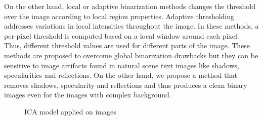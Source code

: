 On the other hand, local or adaptive binarization \cite{A8} methods changes the threshold over the image according to local region properties.
Adaptive thresholding addresses variations in local intensities throughout the image.
In these methods, a per-pixel threshold is computed based on a local window around each pixel.
Thus, different threshold values are used for different parts of the image.
These methods are proposed to overcome global binarization drawbacks but they can be sensitive
to image artifacts found in natural scene text images like shadows, specularities and reflections.
On the other hand, we propose a method that removes shadows, specularity and reflections and thus produces a clean
binary images even for the images with complex background.
\begin{figure}[t]
\centering
{}
\caption
{ICA model applied on images}
\label{fig:ICAmodel}
\end{figure}
